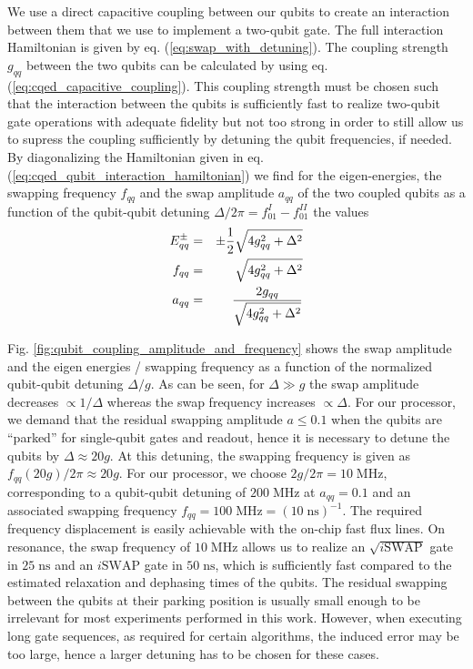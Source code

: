 We use a direct capacitive coupling between our qubits to create an interaction between them that we use to implement a two-qubit gate. The full interaction Hamiltonian is given by eq. (\ref{eq:swap_with_detuning}). The coupling strength $g_{qq}$ between the two qubits can be calculated by using eq. (\ref{eq:cqed_capacitive_coupling}). This coupling strength must be chosen such that the interaction between the qubits is sufficiently fast to realize two-qubit gate operations with adequate fidelity but not too strong in order to still allow us to supress the coupling sufficiently by detuning the qubit frequencies, if needed. By diagonalizing the Hamiltonian given in eq. (\ref{eq:cqed_qubit_interaction_hamiltonian}) we find for the eigen-energies, the swapping frequency $f_{qq}$ and the swap amplitude $a_{qq}$ of the two coupled qubits as a function of the qubit-qubit detuning $\Delta/2\pi=f_{01}^I-f_{01}^{II}$ the values
%
\begin{eqnarray}
E_{qq}^\pm & = & \pm\frac{1}{2}\sqrt{4g_{qq}^2+\Delta^2} \notag \\
f_{qq}     & = & \sqrt{4g_{qq}^2+\Delta^2} \notag \\
a_{qq}     & = & \frac{2g_{qq}}{\sqrt{4g_{qq}^2+\Delta^2}} \label{eq:qubit_coupling_amplitude_and_frequency}
\end{eqnarray}
%

Fig. \ref{fig:qubit_coupling_amplitude_and_frequency} shows the swap amplitude and the eigen energies / swapping frequency as a function of the normalized qubit-qubit detuning $\Delta/g$. As can be seen, for $\Delta \gg g$ the swap amplitude decreases $\propto 1/\Delta$ whereas the swap frequency increases $\propto \Delta$. For our processor, we demand that the residual swapping amplitude $a\le 0.1$ when the qubits are ``parked'' for single-qubit gates and readout, hence it is necessary to detune the qubits by $\Delta \approx 20 g$. At this detuning, the swapping frequency is given as $f_{qq}(20 g)/2\pi\approx 20 g$. For our processor, we choose $2g/2\pi = 10\;\mathrm{MHz}$, corresponding to a qubit-qubit detuning of $200\;\mathrm{MHz}$ at $a_{qq}=0.1$ and an associated swapping frequency $f_{qq}=100\;\mathrm{MHz}=(10\;\mathrm{ns})^{-1}$. The required frequency displacement is easily achievable with the on-chip fast flux lines. On resonance, the swap frequency of $10\;\mathrm{MHz}$ allows us to realize an $\sqrt{i\mathrm{SWAP}}$ gate in $25\;\mathrm{ns}$ and an $i\mathrm{SWAP}$ gate in $50\;\mathrm{ns}$, which is sufficiently fast compared to the estimated relaxation and dephasing times of the qubits. The residual swapping between the qubits at their parking position is usually small enough to be irrelevant for most experiments performed in this work. However, when executing long gate sequences, as required for certain algorithms, the induced error may be too large, hence a larger detuning has to be chosen for these cases.

